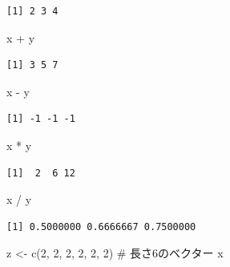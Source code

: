 \documentclass[
  letterpaper,
  DIV=11,
  numbers=noendperiod]{scrreprt}
\newenvironment{Shaded}{\begin{snugshade}}{\end{snugshade}}
\newcommand{\CommentTok}[1]{\textcolor[rgb]{0.37,0.37,0.37}{#1}}
\newcommand{\DecValTok}[1]{\textcolor[rgb]{0.68,0.00,0.00}{#1}}
\newcommand{\FunctionTok}[1]{\textcolor[rgb]{0.28,0.35,0.67}{#1}}
\newcommand{\NormalTok}[1]{\textcolor[rgb]{0.00,0.23,0.31}{#1}}
\newcommand{\OtherTok}[1]{\textcolor[rgb]{0.00,0.23,0.31}{#1}}
\newcommand{\SpecialCharTok}[1]{\textcolor[rgb]{0.37,0.37,0.37}{#1}}
\begin{document}
\begin{verbatim}
[1] 2 3 4
\end{verbatim}

\begin{Shaded}
\begin{Highlighting}[]
\NormalTok{x }\SpecialCharTok{+}\NormalTok{ y }
\end{Highlighting}
\end{Shaded}

\begin{verbatim}
[1] 3 5 7
\end{verbatim}

\begin{Shaded}
\begin{Highlighting}[]
\NormalTok{x }\SpecialCharTok{{-}}\NormalTok{ y}
\end{Highlighting}
\end{Shaded}

\begin{verbatim}
[1] -1 -1 -1
\end{verbatim}

\begin{Shaded}
\begin{Highlighting}[]
\NormalTok{x }\SpecialCharTok{*}\NormalTok{ y}
\end{Highlighting}
\end{Shaded}

\begin{verbatim}
[1]  2  6 12
\end{verbatim}

\begin{Shaded}
\begin{Highlighting}[]
\NormalTok{x }\SpecialCharTok{/}\NormalTok{ y}
\end{Highlighting}
\end{Shaded}

\begin{verbatim}
[1] 0.5000000 0.6666667 0.7500000
\end{verbatim}

\begin{Shaded}
\begin{Highlighting}[]
\NormalTok{z }\OtherTok{\textless{}{-}} \FunctionTok{c}\NormalTok{(}\DecValTok{2}\NormalTok{, }\DecValTok{2}\NormalTok{, }\DecValTok{2}\NormalTok{, }\DecValTok{2}\NormalTok{, }\DecValTok{2}\NormalTok{, }\DecValTok{2}\NormalTok{) }\CommentTok{\# 長さ6のベクター}
\NormalTok{x}
\end{Highlighting}
\end{Shaded}
\end{document}
